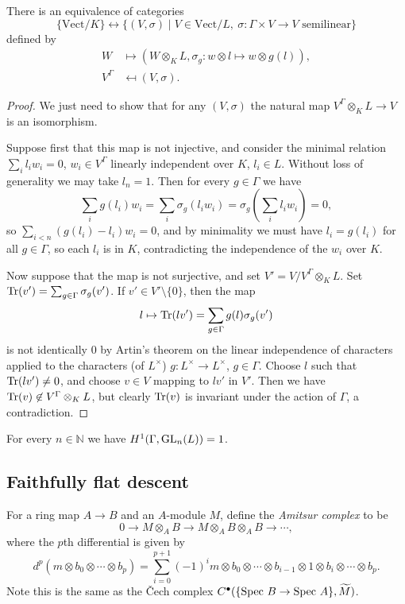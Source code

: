 \begin{thm} There is an equivalence of categories
\[
\{\mbox{Vect}/K\} \leftrightarrow \{(V,\sigma)\mid V \in \mbox{Vect}/L,\ \sigma: \Gamma\times V \rightarrow V \mbox{ semilinear}\}
\]
defined by
\begin{align*}
W &\mapsto (W\otimes_K L, \sigma_g: w\otimes l \mapsto w\otimes g(l)),\\
V^\Gamma &\mapsfrom (V,\sigma).
\end{align*}
\end{thm}
\begin{proof} We just need to show that for any $(V,\sigma)$ the natural map $V^\Gamma\otimes_K L \rightarrow V$ is an isomorphism.

Suppose first that this map is not injective, and consider the minimal relation $\sum_i l_iw_i = 0$, $w_i\in V^\Gamma$ linearly independent over $K$, $l_i \in L$. Without loss of generality we may take $l_n = 1$. Then for every $g \in \Gamma$ we have
\[
\sum_i g(l_i)w_i = \sum_i \sigma_g(l_iw_i) = \sigma_g\left(\sum_i l_iw_i\right) = 0,
\]
so $\sum_{i<n} (g(l_i)-l_i)w_i = 0$, and by minimality we must have $l_i = g(l_i)$ for all $g \in \Gamma$, so each $l_i$ is in $K$, contradicting the independence of the $w_i$ over $K$.

Now suppose that the map is not surjective, and set $V' = V/V^\Gamma\otimes_KL$. Set $\mbox{\rm Tr}(v') = \sum_{g\in\Gamma}\sigma_g(v')$. If $v' \in V'\setminus\{0\}$, then the map
\[
l \mapsto \mbox{\rm Tr}(lv') = \sum_{g\in\Gamma}g(l)\sigma_g(v')
\]
is not identically $0$ by Artin's theorem on the linear independence of characters applied to the characters (of $L^\times$) $g:L^\times \rightarrow L^\times$, $g\in\Gamma$. Choose $l$ such that $\mbox{\rm Tr}(lv') \ne 0$, and choose $v\in V$ mapping to $lv'$ in $V'$. Then we have $\mbox{\rm Tr}(v) \not\in V^\Gamma\otimes_KL$, but clearly $\mbox{\rm Tr}(v)$ is invariant under the action of $\Gamma$, a contradiction.
\end{proof}

\begin{cor} For every $n\in \mathbb{N}$ we have $H^1(\Gamma,\mbox{\rm GL}_n(L)) = 1$.
\end{cor}

\subsection{Faithfully flat descent}

For a ring map $A\rightarrow B$ and an $A$-module $M$, define the \emph{Amitsur complex} to be
\[
0 \rightarrow M\otimes_AB \rightarrow M\otimes_AB\otimes_AB \rightarrow \cdots,
\]
where the $p$th differential is given by
\[
d^p(m\otimes b_0\otimes \cdots \otimes b_p) = \sum_{i=0}^{p+1} (-1)^i m\otimes b_0 \otimes \cdots \otimes b_{i-1} \otimes 1 \otimes b_i \otimes \cdots \otimes b_p.
\]
Note this is the same as the \v{C}ech complex $C^\bullet(\{\mbox{\rm Spec }B\rightarrow\mbox{\rm Spec }A\},\widetilde{M})$.

